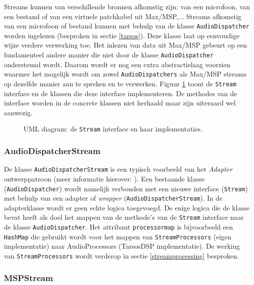 Streams kunnen van verschillende bronnen afkomstig zijn: van een microfoon, van een bestand of van een virtuele patchkabel uit Max/MSP,... Streams afkomstig van een microfoon of bestand kunnen met behulp van de klasse \texttt{AudioDispatcher} worden ingelezen (besproken in sectie \ref{tarsos}). Deze klasse laat op eenvoudige wijze verdere verwerking toe. Het inlezen van data uit Max/MSP gebeurt op een fundamenteel andere manier die niet door de klasse \texttt{AudioDispatcher} ondersteund wordt. Daarom wordt er nog een extra abstractielaag voorzien waarmee het mogelijk wordt om zowel \texttt{AudioDispatchers} als Max/MSP streams op dezelfde manier aan te spreken en te verwerken. Figuur \ref{StreamUml} toont de \texttt{Stream} interface en de klassen die deze interface implementeren. De methodes van de interface worden in de concrete klassen niet herhaald maar zijn uiteraard wel aanwezig.

\begin{figure}[h!]
	\captionsetup{width=0.7\textwidth}
	\caption[UML diagram van streams]{UML diagram: de \texttt{Stream} interface en haar implementaties.}
	\begin{center}
		\advance\parskip0.3cm
		
	\end{center}
	\label{StreamUml}
\end{figure}

\subsubsection{AudioDispatcherStream}
De klasse \texttt{AudioDispatcherStream} is een typisch voorbeeld van het \textit{Adapter} ontwerppatroon (meer informatie hierover: \cite{vlissides1995design}). Een bestaande klasse (\texttt{AudioDispatcher}) wordt namelijk verbonden met een nieuwe interface (\texttt{Stream}) met behulp van een adapter of \textit{wrapper} (\texttt{AudioDispatcherStream}). In de adapterklasse wordt er geen echte logica toegevoegd. De enige logica die de klasse bevat heeft als doel het mappen van de methode's van de \texttt{Stream} interface naar de klasse \texttt{AudioDispatcher}. Het attribuut \texttt{processormap} is bijvoorbeeld een \texttt{HashMap} die gebruikt wordt voor het mappen van \texttt{StreamProcessors} (eigen implementatie) naar AudioProcessors (TarsosDSP implementatie). De werking van \texttt{StreamProcessors} wordt verderop in sectie \ref{streamprocessing} besproken.

\subsubsection{MSPStream}

